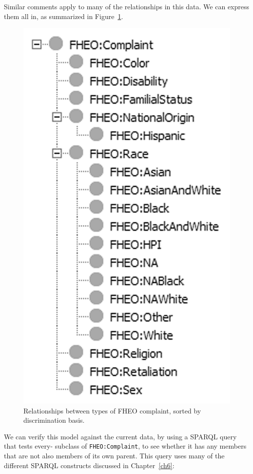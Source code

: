 Similar comments apply to many of the relationships in this data. We can
express them all in, as summarized in Figure~\ref{fig:ch10.1}.

\begin{figure}
\centering
\includegraphics[width=5in]{media/ch10/f10-01.png}
\caption{Relationships between types of FHEO complaint, sorted by discrimination basis.}
\label{fig:ch10.1}
\end{figure}



We can verify this model against the current data, by using a SPARQL
query that tests every- subclass of \texttt{FHEO:Complaint}, to see whether it
has any members that are not also members of its own parent. This query
uses many of the different SPARQL constructs discussed in Chapter~\ref{ch6}:

